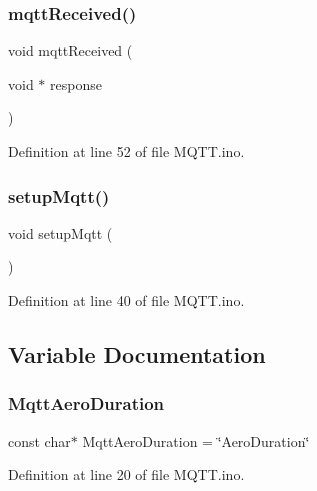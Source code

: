 \subsubsection{\texorpdfstring{mqttReceived()}{mqttReceived()}}
{\footnotesize\ttfamily void mqtt\+Received (\begin{DoxyParamCaption}\item[{void $\ast$}]{response }\end{DoxyParamCaption})}



Definition at line 52 of file M\+Q\+T\+T.\+ino.

\mbox{\label{_m_q_t_t_8ino_ad05a6aa6821baf0d8fe74cf150c3c57c}} 
\subsubsection{\texorpdfstring{setupMqtt()}{setupMqtt()}}
{\footnotesize\ttfamily void setup\+Mqtt (\begin{DoxyParamCaption}{ }\end{DoxyParamCaption})}



Definition at line 40 of file M\+Q\+T\+T.\+ino.



\subsection{Variable Documentation}
\mbox{\label{_m_q_t_t_8ino_aadecb272d7088d8582f2211588767076}} 
\subsubsection{\texorpdfstring{MqttAeroDuration}{MqttAeroDuration}}
{\footnotesize\ttfamily const char$\ast$ Mqtt\+Aero\+Duration = \char`\"{}Aero\+Duration\char`\"{}}



Definition at line 20 of file M\+Q\+T\+T.\+ino.

\mbox{\label{_m_q_t_t_8ino_ae7516d1ca4ad337f9be7d07b556090e5}} 
